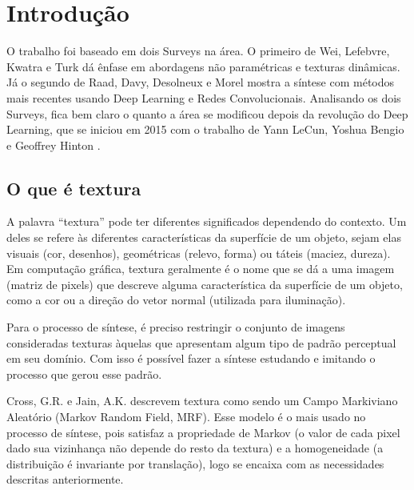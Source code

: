 \chapter{Introdução}



O trabalho foi baseado em dois Surveys
na área. O primeiro de Wei, Lefebvre, Kwatra
e Turk \cite{Wei2009} dá ênfase em
abordagens não paramétricas e texturas
dinâmicas. Já o segundo de Raad, Davy, 
Desolneux e Morel \cite{Raad2018} mostra
a síntese com métodos mais recentes
usando Deep Learning e Redes Convolucionais.
Analisando os dois Surveys, fica bem claro o 
quanto a área se modificou depois da
revolução do Deep Learning, que se iniciou
em 2015 com o trabalho de Yann LeCun, 
Yoshua Bengio e Geoffrey Hinton \cite{LeCun2015}.

\section{O que é textura}



A palavra ``textura'' pode ter diferentes significados
dependendo do contexto.
Um deles se refere às
diferentes características da superfície de um objeto,
sejam elas visuais (cor, desenhos), geométricas (relevo,
forma) ou táteis (maciez, dureza). 
Em computação gráfica, textura geralmente é
o nome que se dá a uma imagem (matriz de pixels)
que descreve alguma
característica da superfície de um objeto,
como a cor ou a direção do vetor normal (utilizada
para iluminação).


Para o processo de síntese, é preciso restringir o
conjunto de imagens consideradas texturas àquelas
que apresentam algum tipo de padrão perceptual
em seu domínio. Com isso é possível fazer a síntese
estudando e imitando o processo que gerou esse padrão.


Cross, G.R. e Jain, A.K. \cite{Cross1983} descrevem
textura como sendo um Campo Markiviano Aleatório
(Markov Random Field, MRF). Esse modelo é o mais
usado no processo de síntese, pois satisfaz a propriedade
de Markov (o valor de cada pixel dado sua vizinhança não
depende do resto da textura) e a homogeneidade (a
distribuição é invariante por translação), logo
se encaixa com as necessidades descritas anteriormente.

